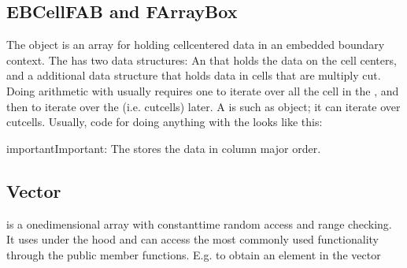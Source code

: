 \documentclass[letterpaper,10pt,english]{sphinxmanual}
\begin{document}
\subsection{EBCellFAB and FArrayBox}
\label{\detokenize{Source/ChomboBasics:ebcellfab-and-farraybox}}
The  object is an array for holding cell\sphinxhyphen{}centered data in an embedded boundary context.
The  has two data structures: An  that holds the data on the cell centers, and a additional data structure that holds data in cells that are multiply cut.
Doing arithmetic with  usually requires one to iterate over all the cell in the , and then to iterate over the  (i.e. cut\sphinxhyphen{}cells) later.
A  is such as object; it can iterate over cut\sphinxhyphen{}cells.
Usually, code for doing anything with the  looks like this:

\begin{sphinxVerbatim}[commandchars=\\\{\},formatcom=\scriptsize]

    
\end{sphinxVerbatim}

\begin{sphinxadmonition}{important}{Important:}
The  stores the data in column major order.
\end{sphinxadmonition}


\subsection{Vector}
\label{\detokenize{Source/ChomboBasics:vector}}
 is a one\sphinxhyphen{}dimensional array with constant\sphinxhyphen{}time random access and range checking.
It uses  under the hood and can access the most commonly used  functionality through the public member functions.
E.g. to obtain an element in the vector
\end{document}
